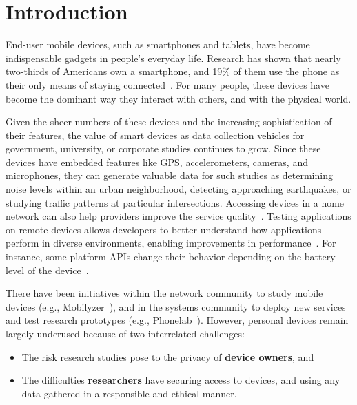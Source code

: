 \section{Introduction}

End-user mobile devices, such as smartphones and tablets, have become
indispensable gadgets in people's everyday life. %
Research has shown that nearly two-thirds of
Americans own a smartphone, and 19\% of them
use the phone as their only means of staying connected~\cite{phone2015}. 
For many people, these devices have become the dominant way they
interact with others, and with the physical world.

Given the sheer numbers of these devices and the increasing
sophistication of their features,
the value of smart devices as data collection vehicles for government,
university, or corporate studies continues to grow. Since
these devices have embedded features like GPS,
accelerometers, cameras, and microphones, they can generate valuable
data for such studies as determining noise levels within an urban
neighborhood, detecting approaching earthquakes, or studying traffic
patterns at particular intersections. Accessing 
devices in a home
network can also help providers improve the service 
quality~\cite{sundaresan2011broadband}. Testing applications on remote
devices allows developers to better understand how applications 
perform in diverse environments, enabling improvements in 
performance~\cite{ravindranath2012appinsight}. For instance, 
some platform APIs change their behavior depending 
on the battery level of the device~\cite{battery}. 

There have been initiatives within the network
community to study mobile devices (e.g.,
Mobilyzer~\cite{nikravesh2015mobilyzer}), and in the systems community
to deploy new services and test research prototypes (e.g.,
Phonelab~\cite{phonelab, nandugudi2013phonelab}). However, personal devices
remain largely underused because of two interrelated challenges:

\begin{itemize}\setlength\itemsep{0em}
\item The risk research studies pose to the privacy of \textbf{device 
owners}, and 

\item The difficulties \textbf{researchers} have
securing access to devices, and using any data gathered in a
responsible and ethical manner. 
\end{itemize}
					
